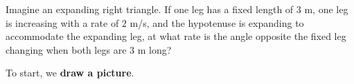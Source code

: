 \documentclass{ximera}
\begin{document}
\begin{example}
  Imagine an expanding right triangle. If one leg has a fixed length
  of $3$ m, one leg is increasing with a rate of $2$ m/s, and the
  hypotenuse is expanding to accommodate the expanding leg, at what
  rate is the angle opposite the fixed leg changing when both legs
  are $3$ m long?
  \begin{explanation}
    To start, we \textbf{draw a picture}.
    \begin{image}
    \end{image} 


\end{explanation}
\end{example}
\end{document}
